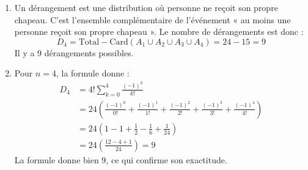 \begin{enumerate}
\begin{enumerate}
        En injectant ces valeurs dans la formule :
        \[
        \text{Card}(A_1 \cup A_2 \cup A_3 \cup A_4) = 24 - 12 + 4 - 1 = 15
        \]
    \end{enumerate}
    
    \item Un dérangement est une distribution où personne ne reçoit son propre chapeau. C'est l'ensemble complémentaire de l'événement « au moins une personne reçoit son propre chapeau ».
    Le nombre de dérangements est donc :
    \[
    D_4 = \text{Total} - \text{Card}(A_1 \cup A_2 \cup A_3 \cup A_4) = 24 - 15 = 9
    \]
    Il y a 9 dérangements possibles.
    
    \item Pour $n=4$, la formule donne :
    \[
    \begin{aligned}
    D_4 &= 4! \sum_{k=0}^4 \frac{(-1)^k}{k!} \\
    &= 24 \left( \frac{(-1)^0}{0!} + \frac{(-1)^1}{1!} + \frac{(-1)^2}{2!} + \frac{(-1)^3}{3!} + \frac{(-1)^4}{4!} \right) \\
    &= 24 \left( 1 - 1 + \frac{1}{2} - \frac{1}{6} + \frac{1}{24} \right) \\
    &= 24 \left( \frac{12 - 4 + 1}{24} \right) = 9
    \end{aligned}
    \]
    La formule donne bien 9, ce qui confirme son exactitude.
\end{enumerate}
